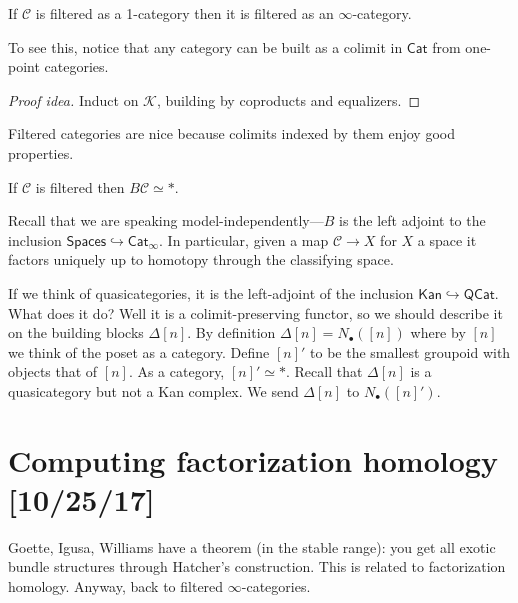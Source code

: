 \documentclass{amsart}
\begin{document}
\begin{lemma}
    If $\mathcal{C}$ is filtered as a 1-category then it is filtered as an $\infty$-category.
\end{lemma}
To see this, notice that any category can be built as a colimit in $\mathsf{Cat}$ from
one-point categories.
\begin{proof}[Proof idea]
    Induct on $\mathcal{K}$, building by coproducts and equalizers.
\end{proof}
Filtered categories are nice because colimits indexed by them enjoy good properties.
\begin{lemma}[HTT 5.3.1.20]
    If $\mathcal{C}$ is filtered then $B\mathcal{C}\simeq *$.
\end{lemma}
Recall that we are speaking model-independently---$B$ is the left adjoint to the
inclusion $\mathsf{Spaces}\hookrightarrow\mathsf{Cat}_\infty$. In particular,
given a map $\mathcal{C}\to X$ for $X$ a space it factors uniquely up to homotopy
through the classifying space.

If we think of quasicategories, it is the left-adjoint of the inclusion $\mathsf{Kan}\hookrightarrow \mathsf{QCat}$.
What does it do? Well it is a colimit-preserving functor, so we should describe it
on the building blocks $\Delta[n]$. By definition $\Delta[n]=N_\bullet([n])$ where
by $[n]$ we think of the poset as a category. Define $[n]'$ to be the smallest groupoid
with objects that of $[n]$.
As a category, $[n]'\simeq *$. Recall that $\Delta[n]$ is
a quasicategory but not a Kan complex. We send $\Delta[n]$ to $N_\bullet([n]')$.

\newpage

\section{Computing factorization homology [10/25/17]}

Goette, Igusa, Williams have a theorem (in the stable range): you get all exotic
bundle structures through Hatcher's construction. This is related to factorization homology.
Anyway, back to filtered $\infty$-categories.
\end{document}
